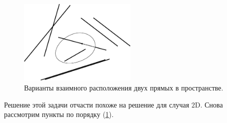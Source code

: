 \documentclass[a4paper,12pt]{article}
\begin{document}
  \begin{solution}
    \begin{figure}[h]
      \centering
      
      \includegraphics[width=0.5\textwidth]{lines-in-3d}
      
      \caption{Варианты взаимного расположения двух прямых в пространстве.}
      \label{fig:lines-in-3d}
    \end{figure}
    
    Решение этой задачи отчасти похоже на решение для случая $2$D.
    Снова рассмотрим пункты по порядку (\ref{fig:lines-in-3d}).
    

\end{solution}
\end{document}

